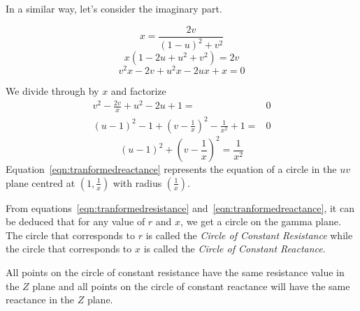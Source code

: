 In a similar way, let's consider the imaginary part.

\begin{equation*}
x = \frac{2v}{{(1 - u)}^2 + v^2}
\end{equation*}
\begin{equation*}
x(1 - 2u + u^2 + v^2) = 2v
\end{equation*}
\begin{equation*}
v^2x - 2v + u^2x - 2ux + x = 0
\end{equation*}


We divide through by $x$ and factorize
\begin{align*}
v^2 - \frac{2v}{x} +u^2 - 2u + 1 =& 0\\
{(u - 1)}^2 -1 + {\left(v - \frac{1}{x}\right)}^2 -\frac{1}{x^2} + 1 =& 0
\end{align*}
\begin{equation}
{(u - 1)}^2 + {\left(v - \frac{1}{x}\right)}^2 = \frac{1}{x^2}\label{eqn:tranformedreactance}
\end{equation}
Equation~\eqref{eqn:tranformedreactance} represents the equation of a circle in the $uv$ plane centred at $\left(1,\frac{1}{x}\right)$ with radius $\left(\frac{1}{x}\right)$.

From equations~\eqref{eqn:tranformedresistance} and~\eqref{eqn:tranformedreactance}, it can be deduced that for any value of $r$ and $x$, we get a circle on the gamma plane. The circle that corresponds to $r$ is called the \emph{Circle of Constant Resistance} while the circle that corresponds to $x$ is called the \emph{Circle of Constant Reactance}.

All points on the circle of constant resistance have the same resistance value in the $Z$ plane and all points on the circle of constant reactance will have the same reactance in the $Z$ plane.

